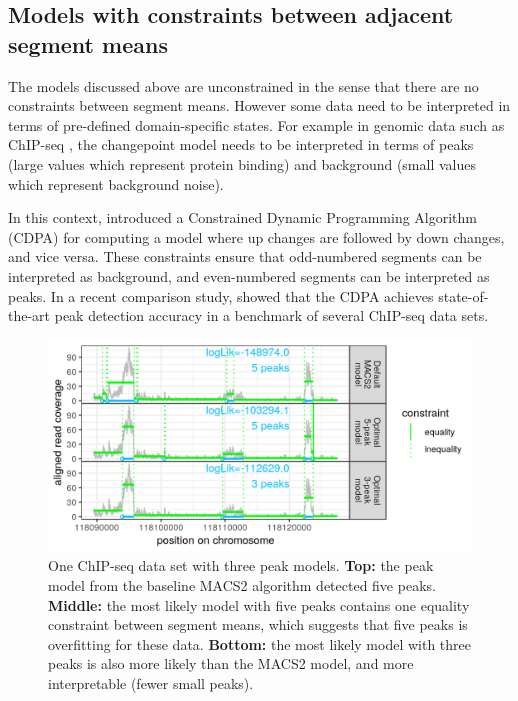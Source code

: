 \documentclass[article]{jss}
\begin{document}
\subsection{Models with constraints between adjacent segment means}


The models discussed above are unconstrained in the sense that there
are no constraints between segment means. However some data need to be
interpreted in terms of pre-defined domain-specific states. For
example in genomic data such as ChIP-seq \citep{chip-seq}, the
changepoint model needs to be interpreted in terms of peaks (large
values which represent protein binding) and background (small values
which represent background noise). 

In this context, \citet{HOCKING-PeakSeg} introduced a Constrained
Dynamic Programming Algorithm (CDPA) for computing a model where up
changes are followed by down changes, and vice versa. These
constraints ensure that odd-numbered segments can be interpreted as
background, and even-numbered segments can be interpreted as peaks.
In a recent comparison study, \citet{HOCKING2016-chipseq} showed that
the CDPA achieves state-of-the-art peak detection accuracy in a
benchmark of several ChIP-seq data sets.

\begin{figure}[t!]
\centering
\includegraphics{jss-figure-more-likely-models-three-peaks}
\caption{\label{fig:three-peaks} One ChIP-seq data set with three peak
  models. \textbf{Top:} the peak model from the baseline MACS2
  algorithm detected five peaks. \textbf{Middle:} the most likely
  model with five peaks contains one equality constraint between
  segment means, which suggests that five peaks is overfitting for
  these data. \textbf{Bottom:} the most likely model with three peaks
  is also more likely than the MACS2 model, and more interpretable
  (fewer small peaks).}
\end{figure}
 
\end{document}

